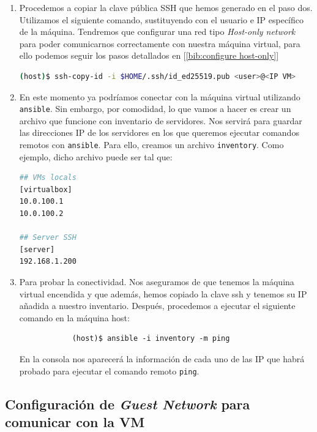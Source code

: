 \documentclass[12pt]{article}
\begin{document}
\begin{enumerate}
		\item Procedemos a copiar la clave pública SSH que hemos generado en el paso dos. Utilizamos el siguiente comando, sustituyendo con el usuario e IP específico de la máquina. Tendremos que configurar una red tipo \textit{Host-only network} para poder comunicarnos correctamente con nuestra máquina virtual, para ello podemos seguir los pasos detallados en [\ref{bib:configure host-only}]
		\begin{lstlisting}[language=Bash, caption={Copiar clave pública de \texttt{ansible} a VM}]
(host)$ ssh-copy-id -i $HOME/.ssh/id_ed25519.pub <user>@<IP VM>
		\end{lstlisting}

		\item En este momento ya podríamos conectar con la máquina virtual utilizando \texttt{ansible}. Sin embargo, por comodidad, lo que vamos a hacer es crear un archivo que funcione con inventario de servidores. Nos servirá para guardar las direcciones IP de los servidores en los que queremos ejecutar comandos remotos con \texttt{ansible}. Para ello, creamos un archivo \texttt{inventory}. Como ejemplo, dicho archivo puede ser tal que:
		\begin{lstlisting}[language=Bash, caption={Contenido del archivo \texttt{inventory} de \texttt{ansible}}]
## VMs locals 
[virtualbox]
10.0.100.1
10.0.100.2
			
## Server SSH
[server]
192.168.1.200
		\end{lstlisting}
		
		\item Para probar la conectividad. Nos aseguramos de que tenemos la máquina virtual encendida y que además, hemos copiado la clave ssh y tenemos su IP añadida a nuestro inventario. Después, procedemos a ejecutar el siguiente comando en la máquina host:
		\begin{verbatim}
			(host)$ ansible -i inventory -m ping
		\end{verbatim}
		\noindent En la consola nos aparecerá la información de cada uno de las IP que habrá probado para ejecutar el comando remoto \texttt{ping}.
	\end{enumerate}
	
	\pagebreak
	
	\subsection{Configuración de \textit{Guest Network} para comunicar con la VM}
	
\end{document}
